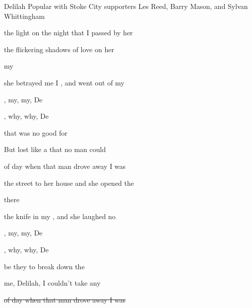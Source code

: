 \begin{SBSong}{Delilah}
  {Popular with Stoke City supporters}
  {Les Reed, Barry Mason, and Sylvan Whittingham}
  \begin{SBVerse}
     the light on the night that I passed by her 

     the flickering shadows of love on her 

      my 
 
     she betrayed me I , and went out of my  
  \end{SBVerse}
  \begin{SBVerse}
    , my, my, De

    , why, why, De

      that  was no good for 

    But  lost like a  that no man could  
  \end{SBVerse}
  \WBPageBrk
  \begin{SBVerse}
     of day when that man drove away I was 

     the street to her house and she opened the 

      there 

     the knife in my , and she laughed no  
  \end{SBVerse}
  \begin{SBVerse}
    , my, my, De

    , why, why, De

     be they  to break down the 

     me, Delilah, I  couldn't take any  
  \end{SBVerse}
  \begin{SBVerse}
    \ifChordBk
      \sout{ of day when that man drove away I was }


\end{SBVerse}
\end{SBSong}
